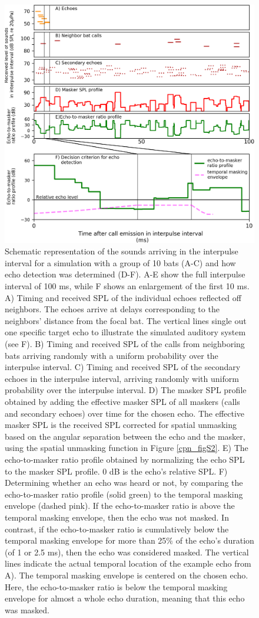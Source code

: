 \documentclass[
]{book}
\begin{document}
\begin{figure}
\includegraphics[]{original_papers/CPN_figures/Figures_SI/Figure_S5.png}
\centering
\caption[caption1]{Schematic representation of the sounds arriving in the interpulse interval for a simulation with a group of 10 bats (A-C) and how echo detection was determined (D-F). A-E show the full interpulse interval of 100 ms, while F shows an enlargement of the first 10 ms.  A) Timing and received SPL of the individual echoes reflected off neighbors. The echoes arrive at delays corresponding to the neighbors’ distance from the focal bat. The vertical lines single out one specific target echo to illustrate the simulated auditory system (see F). B) Timing and received SPL of the calls from neighboring bats arriving randomly with a uniform probability over the interpulse interval. C) Timing and received SPL of the secondary echoes in the interpulse interval, arriving randomly with uniform probability over the interpulse interval. D) The masker SPL profile obtained by adding the effective masker SPL of all maskers (calls and secondary echoes) over time for the chosen echo. The effective masker SPL is the received SPL corrected for spatial unmasking based on the angular separation between the echo and the masker, using the spatial unmasking function in Figure \ref{cpn_figS2}. E) The echo-to-masker ratio profile obtained by normalizing the echo SPL to the masker SPL profile. 0 dB is the echo's relative SPL. F) Determining whether an echo was heard or not, by comparing the echo-to-masker ratio profile (solid green) to the temporal masking envelope (dashed pink). If the echo-to-masker ratio is above the temporal masking envelope, then the echo was not masked. In contrast, if the echo-to-masker ratio is cumulatively below the temporal masking envelope for more than 25$\%$ of the echo's duration (of 1 or 2.5 ms), then the echo was considered masked. The vertical lines indicate the actual temporal location of the example echo from A). The temporal masking envelope is centered on the chosen echo. Here, the echo-to-masker ratio is below the temporal masking envelope for almost a whole echo duration, meaning that this echo was masked.
}
\end{figure}
\end{document}
